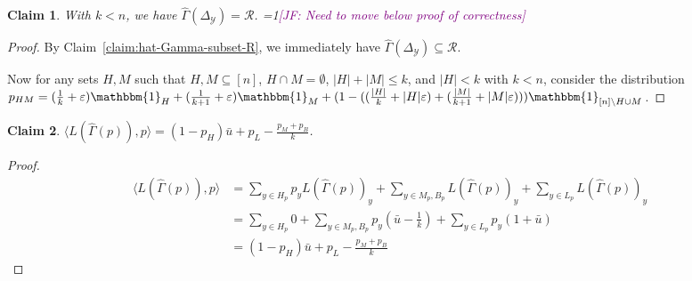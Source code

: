 \documentclass[12pt]{article}
\newcommand{\Comments}{1}
\newcommand{\mynote}[2]{\ifnum\Comments=1\textcolor{#1}{#2}\fi}
\newcommand{\jessie}[1]{\mynote{purple}{[JF: #1]}}
\newcommand{\simplex}{\Delta_\Y}
\newcommand{\R}{\mathcal{R}}
\newcommand{\Y}{\mathcal{Y}}
\newcommand{\inprod}[2]{\langle #1, #2 \rangle}%
\newcommand{\ones}{\mathbbm{1}}
\newtheorem{claim}{Claim}
\begin{document}
\begin{claim}
	With $k < n$, we have $\hat \Gamma(\simplex) = \R$.
	\jessie{Need to move below proof of correctness}
\end{claim}
\begin{proof}
	By Claim~\ref{claim:hat-Gamma-subset-R}, we immediately have $\hat \Gamma(\simplex) \subseteq \R$.
	
	Now for any sets $H,M$ such that $H, M \subseteq [n]$, $H \cap M = \emptyset$, $|H| + |M| \leq k$, and $|H| < k$ with $k <n$, consider the distribution $p_{HM} = (\frac{1}{k} + \varepsilon)\ones_{H} + (\frac{1}{k+1} + \varepsilon)\ones_M + (1 - ((\frac{|H|}{k} + |H| \varepsilon) + (\frac{|M|}{k+1} + |M| \varepsilon))) \ones_{[n] \setminus H\cup M} $.
\end{proof}

\begin{claim}
	$\inprod{L(\hat \Gamma(p))}{p} = (1-p_H) \bar u + p_L - \frac{p_M + p_B}{k}$. 
\end{claim}
\begin{proof}
	\begin{align*}
	\inprod{L(\hat \Gamma(p))}{p} &=
	\sum_{y \in H_p} p_y L(\hat \Gamma(p))_y + \sum_{y \in M_p, B_p} L(\hat \Gamma(p))_y + \sum_{y \in L_p}L(\hat \Gamma(p))_y \\
	&= \sum_{y \in H_p} 0 + \sum_{y \in M_p, B_p} p_y(\bar u - \frac{1}{k}) + \sum_{y \in L_p} p_y(1 + \bar u) \\
	&= (1-p_H) \bar u + p_L - \frac{p_M + p_B}{k}
	\end{align*}
\end{proof}
\end{document}
